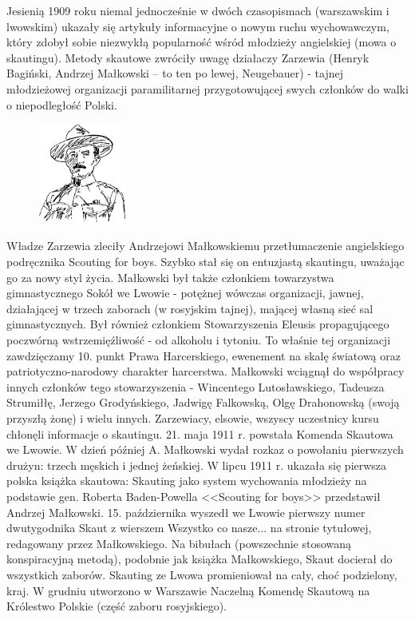 Jesienią 1909 roku niemal jednocześnie w dwóch czasopismach (warszawskim i lwowskim) ukazały się artykuły informacyjne o nowym ruchu wychowawczym, który zdobył sobie niezwykłą popularność wśród młodzieży angielskiej (mowa o skautingu). Metody skautowe zwróciły uwagę działaczy Zarzewia (Henryk Bagiński, Andrzej Małkowski – to ten po lewej, Neugebauer) - tajnej młodzieżowej organizacji paramilitarnej przygotowującej swych członków do walki o niepodległość Polski.\begin{figure}
  \begin{center}
    \includegraphics[width=2.9cm]{grafiki/malkowski.png}
  \end{center}
\end{figure} Władze Zarzewia zleciły Andrzejowi Małkowskiemu przetłumaczenie angielskiego podręcznika Scouting for boys. Szybko stał się on entuzjastą skautingu, uważając go za nowy styl życia.
Małkowski był także członkiem towarzystwa gimnastycznego Sokół we Lwowie - potężnej wówczas organizacji, jawnej, działającej w trzech zaborach (w rosyjskim tajnej), mającej własną sieć sal gimnastycznych. Był również członkiem Stowarzyszenia Eleusis propagującego poczwórną wstrzemięźliwość - od alkoholu  i tytoniu. To właśnie tej organizacji zawdzięczamy 10. punkt Prawa Harcerskiego, ewenement na skalę światową oraz patriotyczno-narodowy charakter harcerstwa. Małkowski wciągnął do współpracy innych członków tego stowarzyszenia - Wincentego Lutosławskiego, Tadeusza Strumiłłę, Jerzego Grodyńskiego, Jadwigę Falkowską, Olgę Drahonowską (swoją przyszłą żonę) i wielu innych. Zarzewiacy, elsowie, wszyscy uczestnicy kursu chłonęli informacje o skautingu. 21. maja 1911 r. powstała Komenda Skautowa we Lwowie. W dzień później A. Małkowski wydał rozkaz o powołaniu pierwszych drużyn: trzech męskich i jednej żeńskiej. W lipcu 1911 r. ukazała się pierwsza polska książka skautowa: Skauting jako system wychowania młodzieży na podstawie gen. Roberta Baden-Powella <<Scouting for boys>> przedstawił Andrzej Małkowski. 15. października wyszedł we Lwowie pierwszy numer dwutygodnika Skaut z wierszem Wszystko co nasze... na stronie tytułowej, redagowany przez Małkowskiego. Na bibułach (powszechnie stosowaną konspiracyjną metodą), podobnie jak książka Małkowskiego, Skaut docierał do wszystkich zaborów. Skauting ze Lwowa promieniował na cały, choć podzielony, kraj. W grudniu utworzono w Warszawie Naczelną Komendę Skautową na Królestwo Polskie (część zaboru rosyjskiego).

